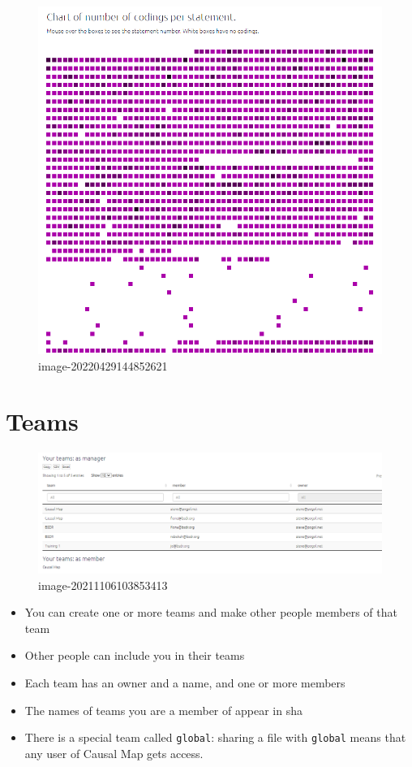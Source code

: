 \documentclass[
]{book}
\providecommand{\tightlist}{%
  \setlength{\itemsep}{0pt}\setlength{\parskip}{0pt}}
\begin{document}
\begin{figure}
\centering
\includegraphics{_assets/image-20220429144852621.png}
\caption{image-20220429144852621}
\end{figure}

\hypertarget{teams}{%
\section{Teams}\label{teams}}

\begin{figure}
\centering
\includegraphics{_assets/image-20211106103853413.png}
\caption{image-20211106103853413}
\end{figure}

\begin{itemize}
\tightlist
\item
  You can create one or more teams and make other people members of that team
\item
  Other people can include you in their teams
\item
  Each team has an owner and a name, and one or more members
\item
  The names of teams you are a member of appear in sha
\item
  There is a special team called \texttt{global}: sharing a file with \texttt{global} means that any user of Causal Map gets access.
\end{itemize}
\end{document}

